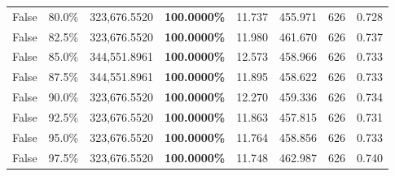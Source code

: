\begin{table}[H]
\begin{tabular}{lllrllll}
\cline{1-8}
False & 80.0\% & 323,676.5520 & \bfseries \color{red} 100.0000\% & 11.737 & 455.971 & 626 & 0.728 \\
\cline{1-8}
False & 82.5\% & 323,676.5520 & \bfseries \color{red} 100.0000\% & 11.980 & 461.670 & 626 & 0.737 \\
\cline{1-8}
False & 85.0\% & 344,551.8961 & \bfseries \color{red} 100.0000\% & 12.573 & 458.966 & 626 & 0.733 \\
\cline{1-8}
False & 87.5\% & 344,551.8961 & \bfseries \color{red} 100.0000\% & 11.895 & 458.622 & 626 & 0.733 \\
\cline{1-8}
False & 90.0\% & 323,676.5520 & \bfseries \color{red} 100.0000\% & 12.270 & 459.336 & 626 & 0.734 \\
\cline{1-8}
False & 92.5\% & 323,676.5520 & \bfseries \color{red} 100.0000\% & 11.863 & 457.815 & 626 & 0.731 \\
\cline{1-8}
False & 95.0\% & 323,676.5520 & \bfseries \color{red} 100.0000\% & 11.764 & 458.856 & 626 & 0.733 \\
\cline{1-8}
False & 97.5\% & 323,676.5520 & \bfseries \color{red} 100.0000\% & 11.748 & 462.987 & 626 & 0.740 \\
\cline{1-8}
\bottomrule
\end{tabular}
\end{table}
